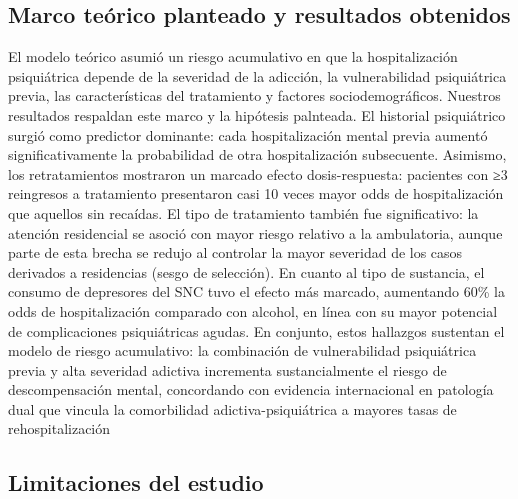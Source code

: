 \documentclass[
  spanish,
  10pt,
]{article}
\begin{document}
\subsection{Marco teórico planteado y resultados
obtenidos}\label{marco-teuxf3rico-planteado-y-resultados-obtenidos}

El modelo teórico asumió un riesgo acumulativo en que la hospitalización
psiquiátrica depende de la severidad de la adicción, la vulnerabilidad
psiquiátrica previa, las características del tratamiento y factores
sociodemográficos. Nuestros resultados respaldan este marco y la
hipótesis palnteada. El historial psiquiátrico surgió como predictor
dominante: cada hospitalización mental previa aumentó significativamente
la probabilidad de otra hospitalización subsecuente. Asimismo, los
retratamientos mostraron un marcado efecto dosis-respuesta: pacientes
con ≥3 reingresos a tratamiento presentaron casi 10 veces mayor odds de
hospitalización que aquellos sin recaídas. El tipo de tratamiento
también fue significativo: la atención residencial se asoció con mayor
riesgo relativo a la ambulatoria, aunque parte de esta brecha se redujo
al controlar la mayor severidad de los casos derivados a residencias
(sesgo de selección). En cuanto al tipo de sustancia, el consumo de
depresores del SNC tuvo el efecto más marcado, aumentando 60\% la odds
de hospitalización comparado con alcohol, en línea con su mayor
potencial de complicaciones psiquiátricas agudas. En conjunto, estos
hallazgos sustentan el modelo de riesgo acumulativo: la combinación de
vulnerabilidad psiquiátrica previa y alta severidad adictiva incrementa
sustancialmente el riesgo de descompensación mental, concordando con
evidencia internacional en patología dual que vincula la comorbilidad
adictiva-psiquiátrica a mayores tasas de rehospitalización

\subsection{Limitaciones del estudio}\label{limitaciones-del-estudio}
\end{document}
